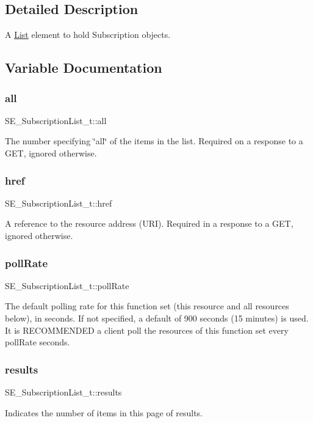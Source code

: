 \subsection{Detailed Description}
A \hyperlink{structList}{List} element to hold Subscription objects. 

\subsection{Variable Documentation}
\mbox{\label{group__SubscriptionList_ga596701373b60b51568eb8c8b02fd402d}} 
\subsubsection{\texorpdfstring{all}{all}}
{\footnotesize\ttfamily S\+E\+\_\+\+Subscription\+List\+\_\+t\+::all}

The number specifying \char`\"{}all\char`\"{} of the items in the list. Required on a response to a G\+ET, ignored otherwise. \mbox{\label{group__SubscriptionList_ga1d0cf0063d777a5d8eee92223453fc62}} 
\subsubsection{\texorpdfstring{href}{href}}
{\footnotesize\ttfamily S\+E\+\_\+\+Subscription\+List\+\_\+t\+::href}

A reference to the resource address (U\+RI). Required in a response to a G\+ET, ignored otherwise. \mbox{\label{group__SubscriptionList_gab52e8c80eb79611d26ca5ba9bd2ddfb7}} 
\subsubsection{\texorpdfstring{poll\+Rate}{pollRate}}
{\footnotesize\ttfamily S\+E\+\_\+\+Subscription\+List\+\_\+t\+::poll\+Rate}

The default polling rate for this function set (this resource and all resources below), in seconds. If not specified, a default of 900 seconds (15 minutes) is used. It is R\+E\+C\+O\+M\+M\+E\+N\+D\+ED a client poll the resources of this function set every poll\+Rate seconds. \mbox{\label{group__SubscriptionList_ga5af7ce11fb113e0ed4ff19b7d8c94b9a}} 
\subsubsection{\texorpdfstring{results}{results}}
{\footnotesize\ttfamily S\+E\+\_\+\+Subscription\+List\+\_\+t\+::results}

Indicates the number of items in this page of results. 